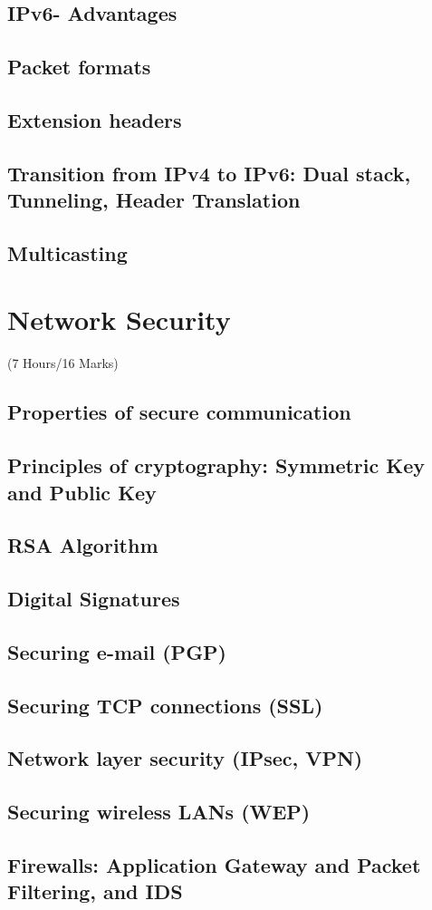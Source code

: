 \documentclass[12pt]{article}
\begin{document}
\subsection{IPv6- Advantages}
\subsection{Packet formats}
\subsection{Extension headers}
\subsection{Transition from IPv4 to IPv6: Dual stack, Tunneling, Header Translation}
\subsection{Multicasting}

\pagebreak
\section{Network Security}
\begin{center}(7 Hours/16 Marks)\end{center}
\subsection{Properties of secure communication}
\subsection{Principles of cryptography: Symmetric Key and Public Key}
\subsection{RSA Algorithm}
\subsection{Digital Signatures}
\subsection{Securing e-mail (PGP)}
\subsection{Securing TCP connections (SSL)}
\subsection{Network layer security (IPsec, VPN)}
\subsection{Securing wireless LANs (WEP)}
\subsection{Firewalls: Application Gateway and Packet Filtering, and IDS}
\end{document}
